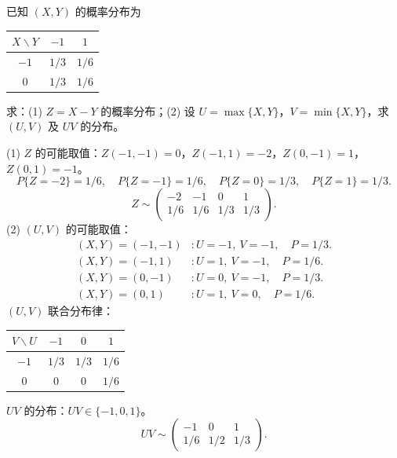 ﻿\documentclass[lang=cn,11pt]{elegantbook}
\begin{document}
\begin{exercise}[离散型函数的分布] \label{exer:3-c9}
已知 $(X,Y)$ 的概率分布为
\begin{center}
\begin{tabular}{c|cc}
\toprule
$X \backslash Y$ & $-1$ & $1$ \\
\midrule
$-1$ & $1/3$ & $1/6$ \\[4pt]
$0$ & $1/3$ & $1/6$ \\
\bottomrule
\end{tabular}
\end{center}
求：(1) $Z = X - Y$ 的概率分布；(2) 设 $U = \max\{X,Y\}$，$V = \min\{X,Y\}$，求 $(U,V)$ 及 $UV$ 的分布。
\end{exercise}
\begin{solution}
(1) $Z$ 的可能取值：$Z(-1,-1)=0$，$Z(-1,1)=-2$，$Z(0,-1)=1$，$Z(0,1)=-1$。
\[
P\{Z=-2\} = 1/6,\quad P\{Z=-1\} = 1/6,\quad P\{Z=0\} = 1/3,\quad P\{Z=1\} = 1/3.
\]
\[
Z \sim \begin{pmatrix} -2 & -1 & 0 & 1 \\ 1/6 & 1/6 & 1/3 & 1/3 \end{pmatrix}.
\]
(2) $(U,V)$ 的可能取值：
\begin{align*}
(X,Y)=(-1,-1) &: U=-1,\ V=-1, \quad P = 1/3. \\
(X,Y)=(-1,1) &: U=1,\ V=-1, \quad P = 1/6. \\
(X,Y)=(0,-1) &: U=0,\ V=-1, \quad P = 1/3. \\
(X,Y)=(0,1) &: U=1,\ V=0, \quad P = 1/6.
\end{align*}
$(U,V)$ 联合分布律：
\begin{center}
\begin{tabular}{c|ccc}
\toprule
$V \backslash U$ & $-1$ & $0$ & $1$ \\
\midrule
$-1$ & $1/3$ & $1/3$ & $1/6$ \\[4pt]
$0$ & $0$ & $0$ & $1/6$ \\
\bottomrule
\end{tabular}
\end{center}
$UV$ 的分布：$UV \in \{-1, 0, 1\}$。
\[
UV \sim \begin{pmatrix} -1 & 0 & 1 \\ 1/6 & 1/2 & 1/3 \end{pmatrix}.
\]
\end{solution}
\end{document}

